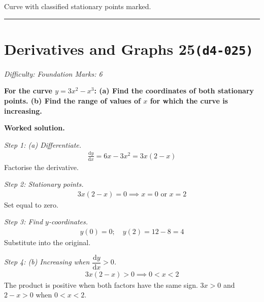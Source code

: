 \documentclass[11pt]{article}
\newcommand{\question}[1]{\par\medskip\noindent\textbf{#1}\par}
\begin{document}
\begin{center}
{
}
\end{center}
\small Curve with classified stationary points marked.\normalsize

\medskip\hrule

\section*{Derivatives and Graphs 25\quad\small\texttt{(d4-025)}}
\textit{Difficulty: Foundation \quad\textbar\quad Marks: 6}

\question{For the curve \( y = 3x^2 - x^3 \): (a) Find the coordinates of both stationary points. (b) Find the range of values of \( x \) for which the curve is increasing.}

\textbf{Worked solution.}

\textit{Step 1: (a) Differentiate.}
\[\begin{gathered}
\frac{\mathrm{d}y}{\mathrm{d}x} = 6x - 3x^2 = 3x(2 - x)
\end{gathered}\]
Factorise the derivative.

\textit{Step 2: Stationary points.}
\[\begin{gathered}
3x(2-x) = 0 \implies x = 0 \text{ or } x = 2
\end{gathered}\]
Set equal to zero.

\textit{Step 3: Find \( y \)-coordinates.}
\[\begin{gathered}
y(0) = 0; \quad y(2) = 12 - 8 = 4
\end{gathered}\]
Substitute into the original.

\textit{Step 4: (b) Increasing when \( \dfrac{\mathrm{d}y}{\mathrm{d}x} > 0 \).}
\[\begin{gathered}
3x(2-x) > 0 \implies 0 < x < 2
\end{gathered}\]
The product is positive when both factors have the same sign. \( 3x > 0 \) and \( 2-x > 0 \) when \( 0 < x < 2 \).
\end{document}
